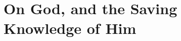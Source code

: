 \documentclass[../main.tex]{subfiles}
\begin{document}
	
	\chapter{On God, and the Saving Knowledge of Him}
	
	

	\theendnotes
	\setcounter{endnote}{0}
\end{document}
